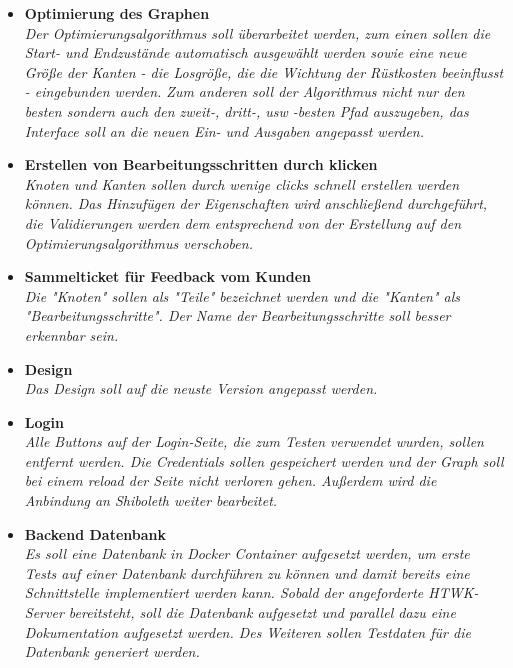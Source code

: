 \begin{itemize}
  \item \textbf{ Optimierung des Graphen }
        \\\textit{
          Der Optimierungsalgorithmus soll überarbeitet werden, zum einen sollen die Start- und Endzustände automatisch ausgewählt werden sowie eine neue Größe der Kanten - die Losgröße, die die Wichtung der Rüstkosten beeinflusst - eingebunden werden. Zum anderen soll der Algorithmus nicht nur den besten sondern auch den zweit-, dritt-, usw -besten Pfad auszugeben, das Interface soll an die neuen Ein- und Ausgaben angepasst werden.}
  \item \textbf{ Erstellen von Bearbeitungsschritten durch klicken }
        \\\textit{
          Knoten und Kanten sollen durch wenige clicks schnell erstellen werden können. Das Hinzufügen der Eigenschaften wird anschließend durchgeführt, die Validierungen werden dem entsprechend von der Erstellung auf den Optimierungsalgorithmus verschoben.}
  \item \textbf{ Sammelticket für Feedback vom Kunden }
        \\\textit{
          Die "Knoten" sollen als "Teile" bezeichnet werden und die "Kanten" als "Bearbeitungsschritte". Der Name der Bearbeitungsschritte soll besser erkennbar sein.}
  \item \textbf{ Design }
        \\\textit{
          Das Design soll auf die neuste Version angepasst werden.}
  \item \textbf{ Login }
        \\\textit{
          Alle Buttons auf der Login-Seite, die zum Testen verwendet wurden, sollen entfernt werden. Die Credentials sollen gespeichert werden und der Graph soll bei einem reload der Seite nicht verloren gehen. Außerdem wird die Anbindung an Shiboleth weiter bearbeitet.}
  \item \textbf{ Backend Datenbank }
        \\\textit{
          Es soll eine Datenbank in Docker Container aufgesetzt werden, um erste Tests auf einer Datenbank durchführen zu können und damit bereits eine Schnittstelle implementiert werden kann. Sobald der angeforderte HTWK-Server bereitsteht, soll die Datenbank aufgesetzt und parallel dazu eine Dokumentation aufgesetzt werden. Des Weiteren sollen Testdaten für die Datenbank generiert werden.}

\end{itemize}

